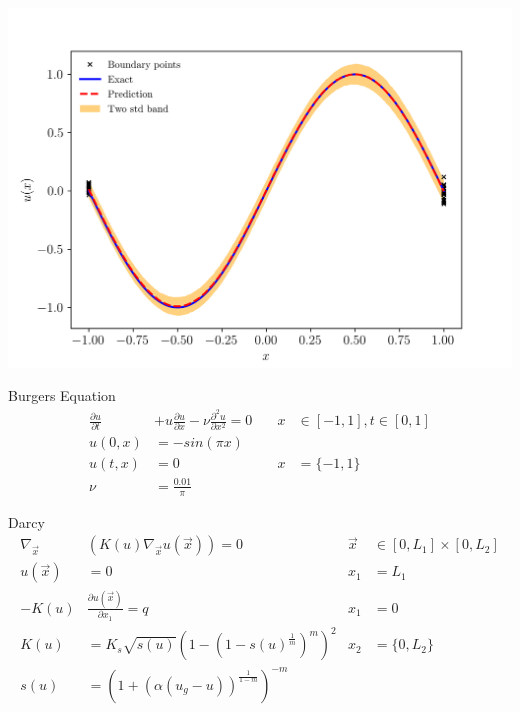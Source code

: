 \documentclass[aspectratio=169]{beamer}
\begin{document}
\begin{frame}{}
    \begin{minipage}[t]{0.5\textwidth}
        \resizebox{\textwidth}{!}{
            
        }
    \end{minipage}\hfill
    \begin{minipage}[t]{0.5\textwidth}
        \includegraphics[width=\textwidth]{./ODE_UQPINN/ODEnew1.png}
    \end{minipage}
\end{frame}

\begin{frame}{Burgers Equation}
    \begin{align*}
        \frac{\partial u}{\partial t} &+ u\frac{\partial u}{\partial x} - \nu \frac{\partial^2 u}{\partial x^2} = 0
         \quad &x&\in[-1,1], t\in[0,1]
        \\
        u(0,x) &= -sin(\pi x)
        \\
        u(t, x) &= 0 \quad & x&=\{-1, 1\}
        \\
        \nu &= \frac{0.01}{\pi}
    \end{align*}
\end{frame}



\begin{frame}{Darcy}
    \begin{align*}
        \nabla_{\vec x} &(K(u)\nabla_{\vec x} u(\vec x)) = 0  & \vec x&\in [0,L_1]\times [0,L_2]
        \\
        u(\vec x) &= 0 & x_1 &= L_1
        \\
        -K(u) &\frac{\partial u(\vec x)}{\partial x_1} = q & x_1 &= 0
        \\
        K(u) & = K_s \sqrt{s(u)} \left(1-(1-s(u)^{\frac{1}{m}})^m\right)^2 & x_2 &= \{0, L_2\}
        \\
        s(u) &= \left(1 + \left(\alpha (u_g - u)\right)^{\frac{1}{1-m}}\right)^{-m}
    \end{align*}
\end{frame}
\end{document}
